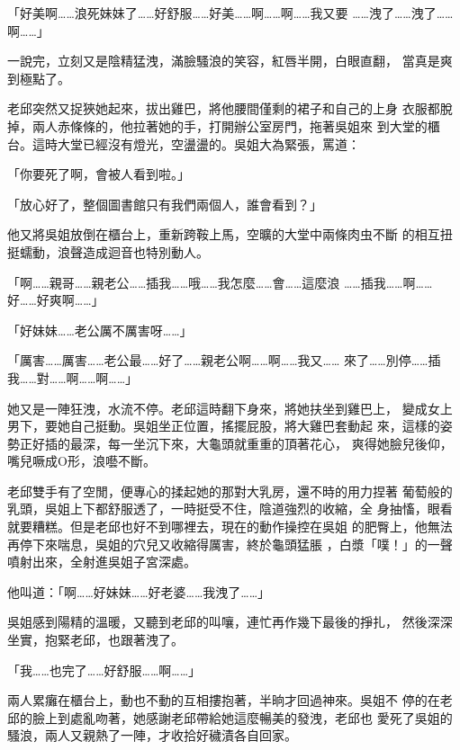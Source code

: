 「好美啊……浪死妹妹了……好舒服……好美……啊……啊……我又要
……洩了……洩了……啊……」

一說完，立刻又是陰精猛洩，滿臉騷浪的笑容，紅唇半開，白眼直翻，
當真是爽到極點了。

老邱突然又捉狹她起來，拔出雞巴，將他腰間僅剩的裙子和自己的上身
衣服都脫掉，兩人赤條條的，他拉著她的手，打開辦公室房門，拖著吳姐來
到大堂的櫃台。這時大堂已經沒有燈光，空盪盪的。吳姐大為緊張，罵道：

「你要死了啊，會被人看到啦。」

「放心好了，整個圖書館只有我們兩個人，誰會看到？」

他又將吳姐放倒在櫃台上，重新跨鞍上馬，空曠的大堂中兩條肉虫不斷
的相互扭挺蠕動，浪聲造成迴音也特別動人。

「啊……親哥……親老公……插我……哦……我怎麼……會……這麼浪
……插我……啊……好……好爽啊……」

「好妹妹……老公厲不厲害呀……」

「厲害……厲害……老公最……好了……親老公啊……啊……我又……
來了……別停……插我……對……啊……啊……」

她又是一陣狂洩，水流不停。老邱這時翻下身來，將她扶坐到雞巴上，
變成女上男下，要她自己挺動。吳姐坐正位置，搖擺屁股，將大雞巴套動起
來，這樣的姿勢正好插的最深，每一坐沉下來，大龜頭就重重的頂著花心，
爽得她臉兒後仰，嘴兒噘成O形，浪囈不斷。

老邱雙手有了空閒，便專心的揉起她的那對大乳房，還不時的用力捏著
葡萄般的乳頭，吳姐上下都舒服透了，一時挺受不住，陰道強烈的收縮，全
身抽慉，眼看就要糟糕。但是老邱也好不到哪裡去，現在的動作操控在吳姐
的肥臀上，他無法再停下來喘息，吳姐的穴兒又收縮得厲害，終於龜頭猛脹
，白漿「噗！」的一聲噴射出來，全射進吳姐子宮深處。

他叫道：「啊……好妹妹……好老婆……我洩了……」

吳姐感到陽精的溫暖，又聽到老邱的叫嚷，連忙再作幾下最後的掙扎，
然後深深坐實，抱緊老邱，也跟著洩了。

「我……也完了……好舒服……啊……」

兩人累癱在櫃台上，動也不動的互相摟抱著，半晌才回過神來。吳姐不
停的在老邱的臉上到處亂吻著，她感謝老邱帶給她這麼暢美的發洩，老邱也
愛死了吳姐的騷浪，兩人又親熱了一陣，才收拾好穢漬各自回家。










